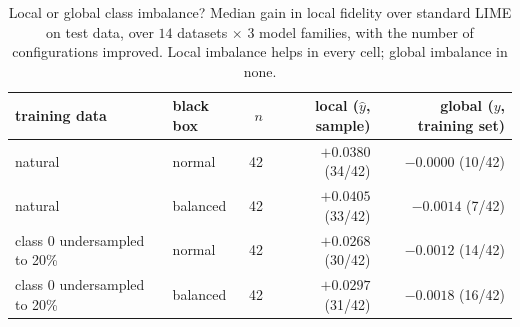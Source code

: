 \begin{table}[H]
  \centering
  \footnotesize
  \caption{Local or global class imbalance? Median gain in local fidelity over standard LIME on test data, over $14$ datasets $\times$ $3$ model families, with the number of configurations improved. Local imbalance helps in every cell; global imbalance in none.}
  \label{tab:balance}
  \begin{tabular}{llrrr}
    \toprule
    training data & black box & $n$ & local ($\hat{y}$, sample) & global ($y$, training set) \\
    \midrule
    natural & normal & 42 & $+0.0380$ (34/42) & $-0.0000$ (10/42) \\
    natural & balanced & 42 & $+0.0405$ (33/42) & $-0.0014$ (7/42) \\
    class 0 undersampled to 20\% & normal & 42 & $+0.0268$ (30/42) & $-0.0012$ (14/42) \\
    class 0 undersampled to 20\% & balanced & 42 & $+0.0297$ (31/42) & $-0.0018$ (16/42) \\
    \bottomrule
  \end{tabular}
\end{table}
